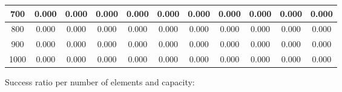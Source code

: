 \documentclass[11pt]{article}
\begin{document}
\begin{table}[h!]
\begin{tabular}{c|cccccccccc|}
\multicolumn{1}{|c|}{700} & \multicolumn{1}{c|}{0.000} & \multicolumn{1}{c|}{0.000} & \multicolumn{1}{c|}{0.000} & \multicolumn{1}{c|}{0.000} & \multicolumn{1}{c|}{0.000} & \multicolumn{1}{c|}{0.000} & \multicolumn{1}{c|}{0.000} & \multicolumn{1}{c|}{0.000} & \multicolumn{1}{c|}{0.000}  & 0.000 \\ \hline
\multicolumn{1}{|c|}{800} & \multicolumn{1}{c|}{0.000} & \multicolumn{1}{c|}{0.000} & \multicolumn{1}{c|}{0.000} & \multicolumn{1}{c|}{0.000} & \multicolumn{1}{c|}{0.000} & \multicolumn{1}{c|}{0.000} & \multicolumn{1}{c|}{0.000} & \multicolumn{1}{c|}{0.000} & \multicolumn{1}{c|}{0.000}  & 0.000 \\ \hline
\multicolumn{1}{|c|}{900} & \multicolumn{1}{c|}{0.000} & \multicolumn{1}{c|}{0.000} & \multicolumn{1}{c|}{0.000} & \multicolumn{1}{c|}{0.000} & \multicolumn{1}{c|}{0.000} & \multicolumn{1}{c|}{0.000} & \multicolumn{1}{c|}{0.000} & \multicolumn{1}{c|}{0.000} & \multicolumn{1}{c|}{0.000}  & 0.000 \\ \hline
\multicolumn{1}{|c|}{1000} & \multicolumn{1}{c|}{0.000} & \multicolumn{1}{c|}{0.000} & \multicolumn{1}{c|}{0.000} & \multicolumn{1}{c|}{0.000} & \multicolumn{1}{c|}{0.000} & \multicolumn{1}{c|}{0.000} & \multicolumn{1}{c|}{0.000} & \multicolumn{1}{c|}{0.000} & \multicolumn{1}{c|}{0.000}  & 0.000 \\ \hline
\end{tabular}
\end{table}
Success ratio per number of elements and capacity:
\end{document}

